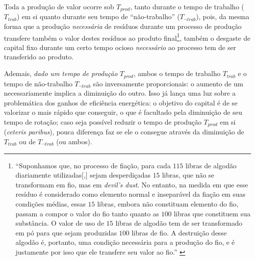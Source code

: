 Toda a produção de valor ocorre sob $T_{prod}$, tanto durante o tempo de trabalho ($T_{trab}$) em si quanto durante seu tempo de ``não-trabalho'' ($T_{\lnot trab}$), pois, da mesma forma que a produção \textit{necessária} de resíduos durante um processo de produção transfere também o valor destes resíduos ao produto final\footnote{``Suponhamos que, no processo de fiação, para cada $115$ libras de algodão diariamente utilizadas[,] sejam desperdiçadas $15$ libras, que não se transformam em fio, mas em \textit{devil's dust}. No entanto, na medida em que esse resíduo é considerado como elemento normal e inseparável da fiação em suas condições médias, essas $15$ libras, embora não constituam elemento do fio, passam a compor o valor do fio tanto quanto as $100$ libras que constituem sua substância. O valor de uso de $15$ libras de algodão tem de ser transformado em pó para que sejam produzidas $100$ libras de fio. A destruição desse algodão é, portanto, uma condição necessária para a produção do fio, e é justamente por isso que ele transfere seu valor ao fio.'' \parencite[p. 282]{Marx2017}}, também o desgaste de capital fixo durante um certo tempo ocioso \textit{necessário} ao processo tem de ser transferido ao produto. 

Ademais, \textit{dado um tempo de produção} $T_{prod}$, ambos o tempo de trabalho $T_{trab}$ e o tempo de não-trabalho $T_{\lnot trab}$ são inversamente proporcionais: o aumento de um necessariamente implica a diminuição do outro. Isso já lança uma luz sobre a problemática dos ganhos de eficiência energética: o objetivo do capital é de se valorizar o mais rápido que conseguir, o que é facultado pela diminuição de seu tempo de rotação; caso seja possível reduzir o tempo de produção $T_{prod}$ em si (\textit{ceteris paribus}), pouca diferença faz se ele o consegue através da diminuição de $T_{trab}$ ou de $T_{\lnot trab}$ (ou ambos). 


